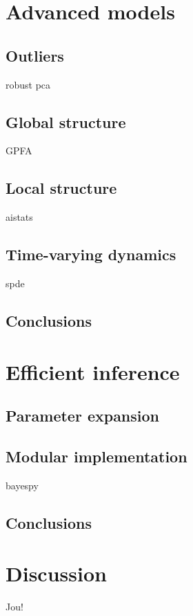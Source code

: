 \documentclass[dissertation,draft]{aaltoseries}
\begin{document}
\chapter{Advanced models}

\section{Outliers}
robust pca

\section{Global structure}
GPFA

\section{Local structure}
aistats

\section{Time-varying dynamics}
spde

\section{Conclusions}




\chapter{Efficient inference}

\section{Parameter expansion}

\section{Modular implementation}
bayespy

\section{Conclusions}



\chapter{Discussion}
Jou! \cite{Luttinen:2013}
\end{document}
